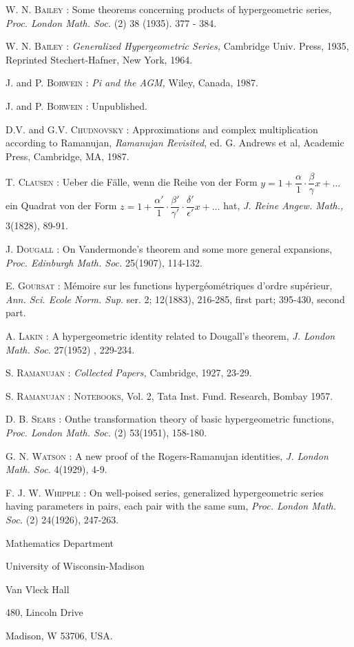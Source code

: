 \begin{thebibliography}{99}
 \textsc{W. N. Bailey} : Some theorems concerning products of hypergeometric series, \textit{Proc. London Math. Soc.} (2) 38 (1935). 377 - 384.

 \textsc{W. N. Bailey} : \textit{Generalized Hypergeometric Series,} Cambridge Univ. Press, 1935, Reprinted Stechert-Hafner,  New York, 1964.

 \textsc{J.} and \textsc{P. Borwein} : \textit{Pi and the AGM,}   Wiley, Canada, 1987.

 J. and \textsc{P. Borwein} : Unpublished. 

 D.V. and G.V. \textsc{Chudnovsky} : Approximations and complex multiplication according to Ramanujan, \textit{Ramanujan Revisited}, ed. G. Andrews et al, Academic Press, Cambridge, MA, 1987. 

 \textsc{T. Clausen} : Ueber die F\"alle, wenn die Reihe von der Form  $y= 1+ \dfrac{\alpha}{1} \cdot \dfrac{\beta}{\gamma} x + \ldots$ ein Quadrat von der Form $z = 1 + \dfrac{\alpha'}{1} \cdot \dfrac{\beta'}{\gamma'} \cdot \dfrac{\delta'}{\epsilon'} x + \ldots$ hat, \textit{J. Reine Angew. Math.,} 3(1828), 89-91.

 \textsc{J. Dougall} : On Vandermonde's theorem and some more general expansions, \textit{Proc. Edinburgh Math. Soc.} 25(1907), 114-132.

 \textsc{E. Goursat} : M\'emoire sur les functions hyperg\'eom\'etriques d'ordre sup\'erieur, \textit{Ann. Sci. Ecole Norm. Sup.} ser. 2; 12(1883), 216-285, first part; 395-430, second part.

 \textsc{A. Lakin} : A hypergeometric identity related to Dougall's theorem,  \textit{J. London Math. Soc.} 27(1952) , 229-234.

 \textsc{S. Ramanujan} : \textit{Collected Papers,} Cambridge, 1927, 23-29. 

 \textsc{S. Ramanujan} : \textsc{Notebooks}, Vol. 2, Tata Inst. Fund. Research, Bombay 1957.  

 \textsc{D. B. Sears} : On\pageoriginale the transformation theory of basic hypergeometric functions, \textit{Proc. London Math. Soc.} (2) 53(1951), 158-180.

 \textsc{G. N. Watson} : A new proof of the Rogers-Ramanujan identities, \textit{J. London Math. Soc.} 4(1929), 4-9.

 \textsc{F. J. W. Whipple} : On well-poised series, generalized hypergeometric series having parameters in pairs, each pair with the same sum, \textit{Proc. London Math. Soc.} (2) 24(1926), 247-263. 
\end{thebibliography}

\medskip
{\small Mathematics Department}

{\small University of Wisconsin-Madison}

{\small Van Vleck Hall}

{\small 480, Lincoln Drive}

{\small Madison, W 53706, USA.}


